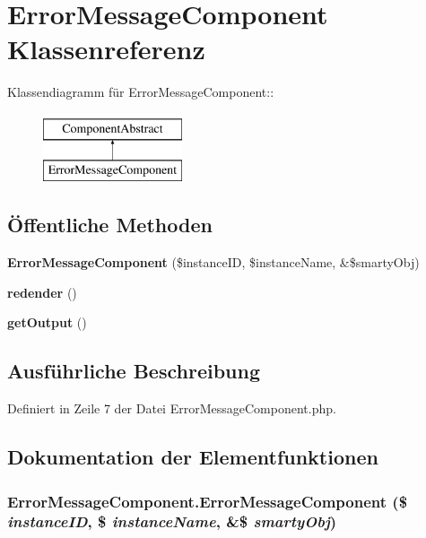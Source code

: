\section{ErrorMessageComponent Klassenreferenz}
\label{classErrorMessageComponent}
Klassendiagramm für ErrorMessageComponent::\begin{figure}[H]
\begin{center}
\leavevmode
\includegraphics[height=2cm]{classErrorMessageComponent}
\end{center}
\end{figure}
\subsection*{Öffentliche Methoden}
\begin{CompactItemize}
\item 
{\bf ErrorMessageComponent} (\$instanceID, \$instanceName, \&\$smartyObj)
\item 
{\bf redender} ()
\item 
{\bf getOutput} ()
\end{CompactItemize}


\subsection{Ausführliche Beschreibung}


Definiert in Zeile 7 der Datei ErrorMessageComponent.php.

\subsection{Dokumentation der Elementfunktionen}
\subsubsection{\setlength{\rightskip}{0pt plus 5cm}ErrorMessageComponent.ErrorMessageComponent (\$ {\em instanceID}, \$ {\em instanceName}, \&\$ {\em smartyObj})}\label{classErrorMessageComponent_6a7ed825ae570b558d327b6755fd9def}





